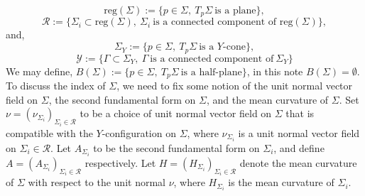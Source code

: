 \documentclass[10pt,a4paper]{amsart}
\theoremstyle{theorem}
\theoremstyle{definition}
\numberwithin{equation}{section}
\begin{document}
$$
\text{reg}(\Sigma):=\{p\in \Sigma,\ T_p\Sigma \ \text{is a plane}\},    
$$
$$
 \mathcal{R}:=\{ \Sigma_i\subset \text{reg}(\Sigma),\ \Sigma_i\ \text{is a connected component of reg}(\Sigma)\}, 
$$
and,
$$
\Sigma_Y:=\{ p\in \Sigma,\ T_p\Sigma \ \text{is a $Y$-cone}\},   
$$
$$
\mathcal{Y}:=\{ \Gamma \subset \Sigma_Y,\  \Gamma \ \text{is a connected component of}\ \Sigma_Y\}
$$
We may define, $B(\Sigma):=\{ p\in \Sigma,\ T_p\Sigma \ \text{is a half-plane}\}$, in this note $B(\Sigma)=\emptyset$.
To discuss the index of $\Sigma$, we need to fix some notion of the unit normal vector field on $\Sigma$, the second fundamental form on $\Sigma$, and the mean curvature of $\Sigma$. Set $\nu=(\nu_{\Sigma_i})_{\Sigma_i\in \mathcal{R}}$ to be a choice of unit normal vector field on $\Sigma$ that is compatible with the $Y$-configuration on $\Sigma$, where $\nu_{\Sigma_i}$ is a unit normal vector field on $\Sigma_i \in \mathcal{R}$. Let $A_{\Sigma_i}$ to be the second fundamental form on $\Sigma_i$, and define $A=(A_{\Sigma_i})_{\Sigma_i\in \mathcal{R}}$ respectively. Let $H=(H_{\Sigma_i})_{\Sigma_i\in \mathcal{R}}$ denote the mean curvature of $\Sigma$ with respect to the unit normal $\nu$, where $H_{\Sigma_i}$ is the mean curvature of $\Sigma_i$.
\medskip
\end{document}
